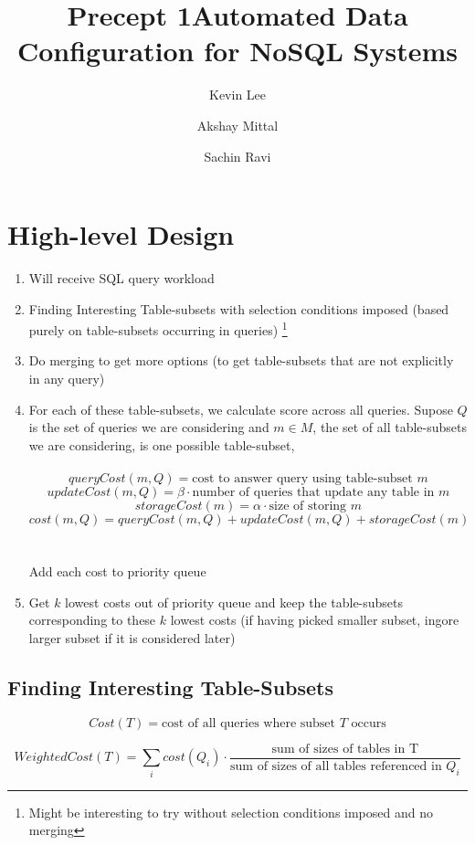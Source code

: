 \documentclass[10pt]{article}
\title{Precept 1}
\begin{document}
\title{\bf Automated Data Configuration for NoSQL Systems}
\author {Kevin Lee \and Akshay Mittal \and Sachin Ravi}

\date{}
\maketitle

\section{High-level Design}
\begin{enumerate}
\item Will receive SQL query workload
\item Finding Interesting Table-subsets with selection conditions imposed (based purely on table-subsets occurring in queries) 
\footnote{Might be interesting to try without selection conditions imposed and no merging}
\item Do merging to get more options (to get table-subsets that are not explicitly in any query)
\item For each of these table-subsets, we calculate score across all queries. 
Supose $Q$ is the set of queries we are considering and $m \in M$, the set of all table-subsets we are considering, is one possible table-subset,
\\
\\
$$queryCost(m, Q) = \textrm{cost to answer query using table-subset $m$}$$
$$updateCost(m,Q) = \beta \cdot \textrm{number of queries that update any table in $m$}$$
$$storageCost(m) = \alpha \cdot \textrm{size of storing $m$}$$
$$cost(m,Q) = queryCost(m,Q) + updateCost(m,Q) + storageCost(m)$$
\\
\\
Add each cost to priority queue
\item Get $k$ lowest costs out of priority queue and keep the table-subsets corresponding to these $k$ lowest costs (if having picked smaller subset, ingore larger subset if it is considered later)
\end{enumerate}

\subsection{Finding Interesting Table-Subsets}
$$ Cost(T) = \textrm{cost of all queries where subset $T$ occurs} $$

$$ WeightedCost(T) = \sum_{i} cost(Q_i) \cdot \frac{\textrm{sum of sizes of tables in T}}{\textrm{sum of sizes of all tables referenced in $Q_i$}} $$
\end{document}
